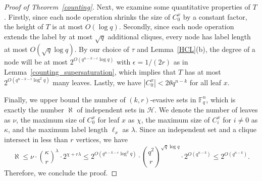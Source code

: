 \documentclass[10pt,a4paper]{amsart}
\begin{document}
\begin{proof}[Proof of Theorem~\ref{counting}]
    Next, we examine some quantitative properties of $T$. Firstly, since each node operation shrinks the size of $C^x_0$ by a constant factor, the height of $T$ is at most $O(\log q)$. Secondly, since each node operation extends the label by at most $\sqrt{q}$ additional cliques, every node has label length at most $O(\sqrt{q}\log q)$. By our choice of $\tau$ and Lemma~\ref{HCL}(b), the degree of a node will be at most $2^{O(q^{n-k-\epsilon}\log q)}$ with $\epsilon=1/(2r)$ as in Lemma~\ref{counting_supersaturation}, which implies that $T$ has at most $2^{O(q^{n-k-\epsilon}\log^2 q)}$ many leaves. Lastly, we have $|C^x_0| < 2\theta q^{n-k}$ for all leaf $x$.

    Finally, we upper bound the number of $(k,r)$-evasive sets in $\mathbb{F}_q^n$, which is exactly the number $\aleph$ of independent sets in $\mathcal{H}$. We denote the number of leaves as $\nu$, the maximum size of $C^x_0$ for leaf $x$ as $\chi$, the maximum size of $C^x_i$ for $i\neq 0$ as $\kappa$, and the maximum label length $\ell_x$ as $\lambda$. Since an independent set and a clique intersect in less than $r$ vertices, we have \begin{equation*}
        \aleph \leq \nu \cdot \binom{\kappa}{r}^\lambda \cdot 2^{\chi+r\lambda}  \leq 2^{O(q^{n-k-\epsilon}\log^2 q)} \cdot \binom{q^2}{r}^{\sqrt{q}\log q} \cdot 2^{O(q^{n-k})} \leq 2^{O(q^{n-k})}.
    \end{equation*} Therefore, we conclude the proof.
\end{proof}
\end{document}
